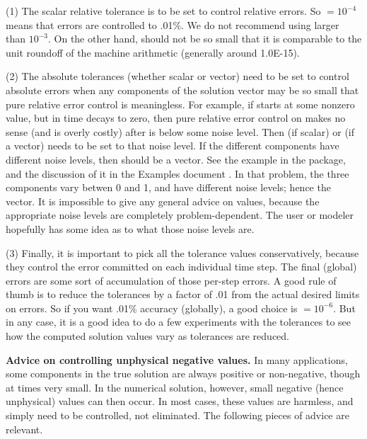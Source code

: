 (1) The scalar relative tolerance  is to be set to control relative
errors.  So  $= 10^{-4}$ means that errors are controlled to .01\%.  
We do not recommend using  larger than $10^{-3}$.  On the other hand,
 should not be so small that it is comparable to the unit roundoff
of the machine arithmetic (generally around 1.0E-15).

(2) The absolute tolerances  (whether scalar or vector) need to
be set to control absolute errors when any components of the solution
vector  may be so small that pure relative error control is
meaningless.  For example, if  starts at some nonzero value, but in time
decays to zero, then pure relative error control on  makes no sense
(and is overly costly) after  is below some noise level.  Then
 (if scalar) or  (if a vector) needs to be set to that
noise level.  If the different components have different noise levels,
then  should be a vector.  See the example  in the
{\cvode} package, and the discussion of it in the {\cvode} Examples document
\cite{cvode_ex}.
In that problem, the three components vary betwen 0 and 1, and have
different noise levels; hence the  vector.  It is impossible to
give any general advice on  values, because the appropriate noise
levels are completely problem-dependent.  The user or modeler hopefully has
some idea as to what those noise levels are.

(3) Finally, it is important to pick all the tolerance values conservatively,
because they control the error committed on each individual time step.
The final (global) errors are some sort of accumulation of those
per-step errors.  A good rule of thumb is to reduce the tolerances by a
factor of .01 from the actual desired limits on errors.  So if you
want .01\% accuracy (globally), a good choice is  $= 10^{-6}$.
But in any case, it is a good idea to do a few experiments with
the tolerances to see how the computed solution values vary as
tolerances are reduced.

\vspace{0.1in}
{\bf Advice on controlling unphysical negative values.}
In many applications, some components in the true solution are always
positive or non-negative, though at times very small.  In the numerical
solution, however, small negative (hence unphysical) values can then
occur.  In most cases, these values are harmless, and simply need to
be controlled, not eliminated. The following pieces of advice are relevant.

